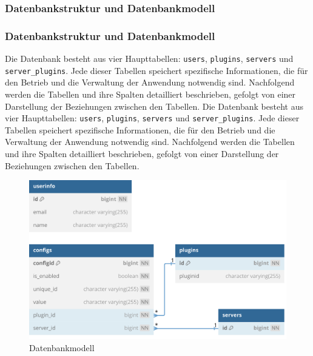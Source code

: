 \subsubsection{Datenbankstruktur und Datenbankmodell}\label{datenbankstruktur-und-datenbankmodell}
\subsubsection{Datenbankstruktur und Datenbankmodell}\label{datenbankstruktur-und-datenbankmodell}

Die Datenbank besteht aus vier Haupttabellen: \texttt{users}, \texttt{plugins}, \texttt{servers} und \texttt{server\_plugins}. Jede dieser Tabellen speichert spezifische Informationen, die für den Betrieb und die Verwaltung der Anwendung notwendig sind. Nachfolgend werden die Tabellen und ihre Spalten detailliert beschrieben, gefolgt von einer Darstellung der Beziehungen zwischen den Tabellen.
Die Datenbank besteht aus vier Haupttabellen: \texttt{users}, \texttt{plugins}, \texttt{servers} und \texttt{server\_plugins}. Jede dieser Tabellen speichert spezifische Informationen, die für den Betrieb und die Verwaltung der Anwendung notwendig sind. Nachfolgend werden die Tabellen und ihre Spalten detailliert beschrieben, gefolgt von einer Darstellung der Beziehungen zwischen den Tabellen.

\begin{figure}[!htbp]
  \centering
  \includegraphics[width=\textwidth]{images/20240529-dbschema.png}
  \caption{Datenbankmodell}\label{fig:database-schema}
\end{figure}
  
